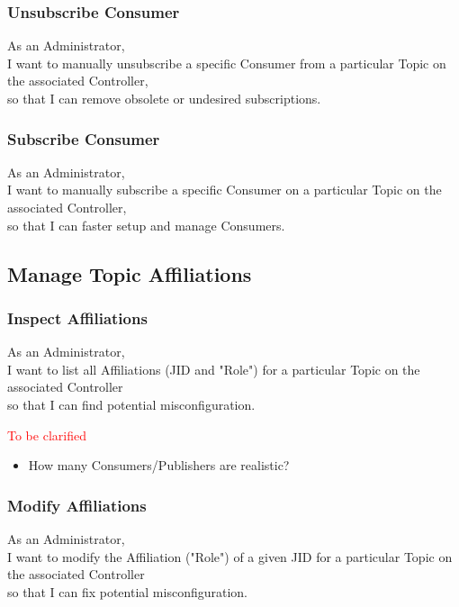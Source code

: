 \subsubsection{Unsubscribe Consumer}

As an Administrator, \\
I want to manually unsubscribe a specific Consumer from a particular Topic on the associated Controller, \\
so that I can remove obsolete or undesired subscriptions.

\subsubsection{Subscribe Consumer}

As an Administrator, \\
I want to manually subscribe a specific Consumer on a particular Topic on the associated Controller, \\
so that I can faster setup and manage Consumers.

\subsection{Manage Topic Affiliations}
\subsubsection{Inspect Affiliations}

As an Administrator,\\
I want to list all Affiliations (JID and "Role") for a particular Topic on the associated Controller \\
so that I can find potential misconfiguration.

\noindent\textcolor{red}{To be clarified}

\begin{itemize}
    \item How many Consumers/Publishers are realistic?
\end{itemize}


\subsubsection{Modify Affiliations}

As an Administrator,\\
I want to modify the Affiliation ("Role") of a given JID for a particular Topic on the associated Controller \\
so that I can fix potential misconfiguration.

